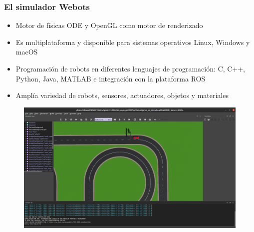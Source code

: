 \begin{frame}\frametitle{El simulador Webots}
  \begin{itemize}
  \item Motor de físicas ODE y OpenGL como motor de renderizado
  \item Es multiplataforma y disponible para sistemas operativos Linux, Windows y macOS
  \item Programación de robots en diferentes lenguajes de programación: C, C++, Python, Java, MATLAB e integración con la plataforma ROS
  \item Amplía variedad de robots, sensores, actuadores, objetos y materiales
  \end{itemize}
  \begin{figure}
    \centering
    \includegraphics[height=0.6\textheight]{Figures/Webots.png}
  \end{figure}
\end{frame}

